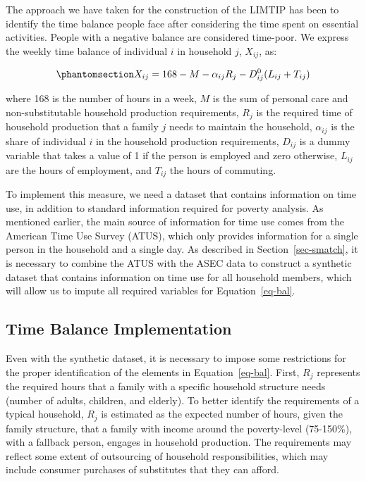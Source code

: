 \documentclass[
  11pt,
]{article}
\begin{document}
The approach we have taken for the construction of the LIMTIP has been
to identify the time balance people face after considering the time
spent on essential activities. People with a negative balance are
considered time-poor. We express the weekly time balance of individual
\(i\) in household \(j\), \(X_{ij}\), as:

\begin{equation}\phantomsection\label{eq-bal}{X_{ij} = 168 - M - \alpha_{ij}R_j-D_{ij}^0(L_{ij}+T_{ij})}\end{equation}

where 168 is the number of hours in a week, \(M\) is the sum of personal
care and non-substitutable household production requirements, \(R_j\) is
the required time of household production that a family \(j\) needs to
maintain the household, \(\alpha_{ij}\) is the share of individual \(i\)
in the household production requirements, \(D_{ij}\) is a dummy variable
that takes a value of 1 if the person is employed and zero otherwise,
\(L_{ij}\) are the hours of employment, and \(T_{ij}\) the hours of
commuting.

To implement this measure, we need a dataset that contains information
on time use, in addition to standard information required for poverty
analysis. As mentioned earlier, the main source of information for time
use comes from the American Time Use Survey (ATUS), which only provides
information for a single person in the household and a single day. As
described in Section~\ref{sec-smatch}, it is necessary to combine the
ATUS with the ASEC data to construct a synthetic dataset that contains
information on time use for all household members, which will allow us
to impute all required variables for Equation~\ref{eq-bal}.

\subsection{Time Balance
Implementation}\label{time-balance-implementation}

Even with the synthetic dataset, it is necessary to impose some
restrictions for the proper identification of the elements in
Equation~\ref{eq-bal}. First, \(R_j\) represents the required hours that
a family with a specific household structure needs (number of adults,
children, and elderly). To better identify the requirements of a typical
household, \(R_j\) is estimated as the expected number of hours, given
the family structure, that a family with income around the poverty-level
(75-150\%), with a fallback person, engages in household production. The
requirements may reflect some extent of outsourcing of household
responsibilities, which may include consumer purchases of substitutes
that they can afford.
\end{document}
